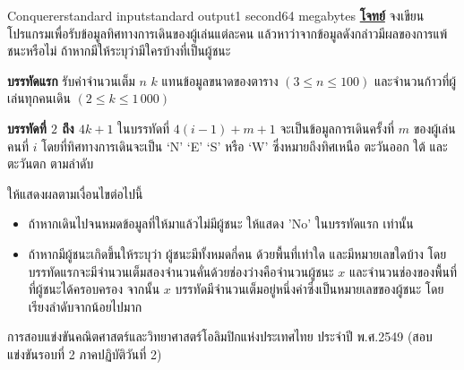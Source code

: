 \documentclass[11pt,a4paper]{article}
\begin{document}
\begin{problem}{Conquerer}{standard input}{standard output}{1 second}{64 megabytes}
\bigskip
\underline{\textbf{โจทย์}}  จงเขียนโปรแกรมเพื่อรับข้อมูลทิศทางการเดินของผู้เล่นแต่ละคน แล้วหาว่าจากข้อมูลดังกล่าวมีผลของการแพ้ชนะหรือไม่ ถ้าหากมีให้ระบุว่ามีใครบ้างที่เป็นผู้ชนะ

\InputFile

\textbf{บรรทัดแรก} รับค่าจำนวนเต็ม $n$ $k$ แทนข้อมูลขนาดของตาราง $(3 \leq n \leq 100)$ และจำนวนก้าวที่ผู้เล่นทุกคนเดิน $(2 \leq k \leq 1\,000)$

\textbf{บรรทัดที่ $2$ ถึง $4k+1$} ในบรรทัดที่ $4(i-1) + m + 1$ จะเป็นข้อมูลการเดินครั้งที่ $m$ ของผู้เล่นคนที่ $i$ โดยที่ทิศทางการเดินจะเป็น ‘N’ ‘E’ ‘S’ หรือ ‘W’ ซึ่งหมายถึงทิศเหนือ ตะวันออก ใต้ และ ตะวันตก ตามลำดับ

\OutputFile

ให้แสดงผลตามเงื่อนไขต่อไปนี้
\begin{itemize}

\item ถ้าหากเดินไปจนหมดข้อมูลที่ให้มาแล้วไม่มีผู้ชนะ ให้แสดง 'No' ในบรรทัดแรก เท่านั้น
\item ถ้าหากมีผู้ชนะเกิดขึ้นให้ระบุว่า ผู้ชนะมีทั้งหมดกี่คน ด้วยพื้นที่เท่าใด และมีหมายเลขใดบ้าง โดยบรรทัดแรกจะมีจำนวนเต็มสองจำนวนคั่นด้วยช่องว่างคือจำนวนผู้ชนะ $x$ และจำนวนช่องของพื้นที่ที่ผู้ชนะได้ครอบครอง จากนั้น $x$ บรรทัดมีจำนวนเต็มอยู่หนึ่งค่าซึ่งเป็นหมายเลขของผู้ชนะ โดยเรียงลำดับจากน้อยไปมาก
\end{itemize}

\Examples

\begin{example}
%
\end{example}


\Source

การสอบแข่งขันคณิตศาสตร์และวิทยาศาสตร์โอลิมปิกแห่งประเทศไทย
ประจำปี พ.ศ.2549 (สอบแข่งขันรอบที่ 2 ภาคปฏิบัติวันที่ 2)

\end{problem}
\end{document}
